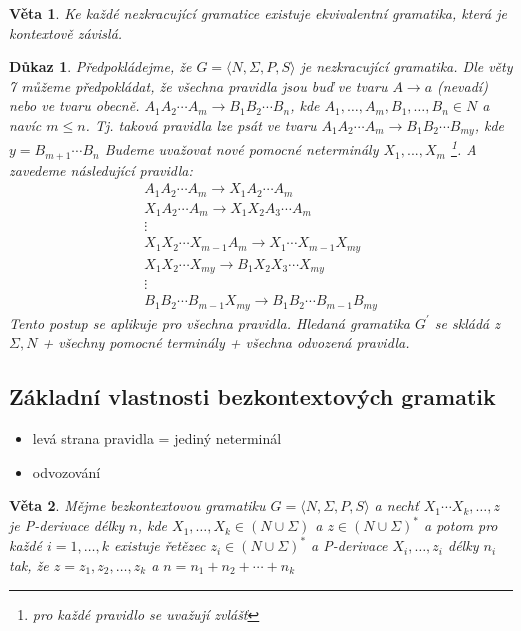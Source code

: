 \documentclass[10pt, a4paper, titlepage]{article}
\theoremstyle{note}
\newtheorem{veta}{\textbf{Věta}}
\newtheorem{dukaz}{\textbf{Důkaz}}
\begin{document}
\begin{veta}
Ke každé nezkracující gramatice existuje ekvivalentní gramatika, která je kontextově \mbox{závislá}.
\end{veta}

\begin{dukaz}
Předpokládejme, že $G = \langle N, \Sigma, P, S \rangle$ je nezkracující gramatika. Dle věty 7 můžeme předpokládat, 
že všechna pravidla jsou buď ve tvaru $A \rightarrow a$ (nevadí) nebo ve tvaru obecně. 
$A_{1} A_{2} \cdots A_{m} \rightarrow B_{1} B_{2} \cdots B_{n}$, kde $A_{1}, \ldots,A_{m}, B_{1}, \ldots,B_{n} \in N$ a navíc $m \leq n$. 
Tj. taková pravidla lze psát ve tvaru $A_{1} A_{2} \cdots A_{m} \rightarrow B_{1} B_{2} \cdots B_{my}$, kde $y = B_{m+1} \cdots B_{n}$ 
Budeme uvažovat nové pomocné neterminály $X_{1},...,X_{m}$ \footnote{pro každé pravidlo se uvažují zvlášť}. 
A zavedeme následující pravidla:
\begin{gather*}
A_{1} A_{2} \cdots A_{m} \rightarrow X_{1} A_{2} \cdots A_{m} \\
X_{1} A_{2} \cdots A_{m} \rightarrow X_{1} X_{2} A_{3} \cdots A_{m} \\
\vdots \\
X_{1} X_{2} \cdots X_{m-1} A_{m} \rightarrow X_{1} \cdots X_{m-1} X_{my} \\
X_{1} X_{2} \cdots X_{my} \rightarrow B_{1} X_{2} X_{3} \cdots X_{my} \\
\vdots \\
B_{1} B_{2} \cdots B_{m-1} X_{my} \rightarrow B_{1} B_{2} \cdots B_{m-1}B_{my}
\end{gather*}
Tento postup se aplikuje pro všechna pravidla. Hledaná gramatika $G^{'}$ se skládá z $\Sigma, N$ + všechny pomocné terminály + všechna odvozená pravidla.
\end{dukaz}

\subsection{Základní vlastnosti bezkontextových gramatik}
\begin{itemize}
\item
levá strana pravidla = jediný neterminál
\item
odvozování 
\end{itemize}

\begin{veta}
Mějme bezkontextovou gramatiku  $G = \langle N, \Sigma, P, S \rangle$ a nechť $X_{1} \cdots X_{k}, \ldots, z$ 
je P-derivace délky $n$, kde $X_{1}, \ldots, X_{k} \in (N \cup \Sigma)$ a $z \in (N \cup \Sigma)^{*}$ 
a potom pro každé $i = 1, \ldots, k$  existuje řetězec $z_{i} \in (N \cup \Sigma)^{*}$ 
a P-derivace $X_{i}, \ldots, z_{i}$ délky $n_{i}$ tak, že $z = z_{1} ,z_{2}, \ldots, z_{k}$ a $n = n_{1} + n_{2} + \cdots + n_{k}$
\end{veta}
\end{document}
